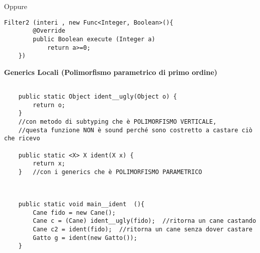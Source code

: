 Oppure 

\begin{lstlisting}[basicstyle=\small,]
	Filter2 (interi , new Func<Integer, Boolean>(){
		@Override
		public Boolean execute (Integer a)
			return a>=0;
	})
\end{lstlisting}

\noindent \textbf{Generics Locali (Polimorfismo parametrico di primo ordine)} 

\begin{lstlisting}[basicstyle=\small,]

    public static Object ident__ugly(Object o) {
        return o;
    }   
    //con metodo di subtyping che è POLIMORFISMO VERTICALE, 
    //questa funzione NON è sound perché sono costretto a castare ciò che ricevo

    public static <X> X ident(X x) {
        return x;
    }   //con i generics che è POLIMORFISMO PARAMETRICO

\end{lstlisting}

\begin{lstlisting}[basicstyle=\small,]

	
	public static void main__ident	(){
		Cane fido = new Cane();
		Cane c = (Cane) ident__ugly(fido);  //ritorna un cane castando
		Cane c2 = ident(fido);  //ritorna un cane senza dover castare
		Gatto g = ident(new Gatto());
	}
\end{lstlisting}





















